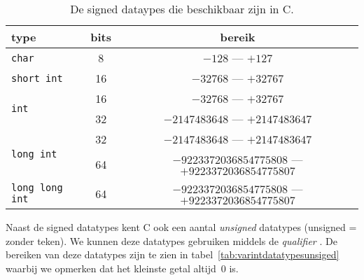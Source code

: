 \begin{table}[!ht]
\centering
\caption{De signed dataypes die beschikbaar zijn in C.}
\label{tab:varintdatatypes}
\begin{tabular}{@{}lcc@{}}
\toprule
\textbf{type}                         & \textbf{bits} & \textbf{bereik}  \\ \midrule
\texttt{char}                         & 8                       & $-128$ --- $+127$  \\
\texttt{short int}                    & 16                      & $-32768$ --- $+32767$ \\
\multirow{2}{*}{\texttt{int}}         & 16                      & $-32768$ --- $+32767$ \\
                                      & 32                      & $-2147483648$ --- $+2147483647$ \\
\multirow{2}{*}{\texttt{long int}}    & 32                      & $-2147483648$ --- $+2147483647$ \\
                                      & 64                      & $-9223372036854775808$ --- $+9223372036854775807$  \\
\texttt{long long int}                & 64                      & $-9223372036854775808$ --- $+9223372036854775807$  \\
   \bottomrule
\end{tabular}
\end{table}


Naast de signed datatypes kent C ook een aantal \textsl{unsigned} datatypes (unsigned = zonder teken).
We kunnen deze datatypes gebruiken middels de \textsl{qualifier} . De bereiken van deze datatypes zijn te zien in tabel~\ref{tab:varintdatatypesunsiged} waarbij we opmerken dat het kleinste getal altijd~0 is.

